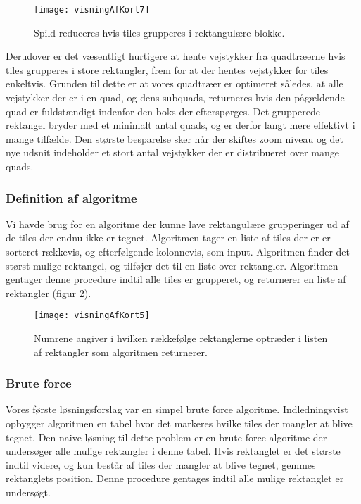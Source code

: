 \begin{figure}[h]
	\centering
	\texttt{[image: visningAfKort7]}
	\captionsetup{width=0.8\textwidth}
	\caption{Spild reduceres hvis tiles grupperes i rektangulære blokke.}
	\label{figur:visningAfKort7}
\end{figure}

Derudover er det væsentligt hurtigere at hente vejstykker fra quadtræerne hvis tiles grupperes i store rektangler, frem for at der hentes vejstykker for tiles enkeltvis. Grunden til dette er at vores quadtræer er optimeret således, at alle vejstykker der er i en quad, og dens subquads, returneres hvis den pågældende quad er fuldstændigt indenfor den boks der efterspørges. Det grupperede rektangel bryder med et minimalt antal quads, og er derfor langt mere effektivt i mange tilfælde. Den største besparelse sker når der skiftes zoom niveau og det nye udsnit indeholder et stort antal vejstykker der er distribueret over mange quads.

\subsubsection{Definition af algoritme}
\label{subsec:definitionAfAlgoritme}

Vi havde brug for en algoritme der kunne lave rektangulære grupperinger ud af de tiles der endnu ikke er tegnet. Algoritmen tager en liste af tiles der er er sorteret rækkevis, og efterfølgende kolonnevis, som input. Algoritmen finder det størst mulige rektangel, og tilføjer det til en liste over rektangler. Algoritmen gentager denne procedure indtil alle tiles er grupperet, og returnerer en liste af rektangler (figur \ref{figur:visningAfKort5}).

\begin{figure}[h]
	\centering
	\texttt{[image: visningAfKort5]}
	\captionsetup{width=0.8\textwidth}
	\caption{Numrene angiver i hvilken rækkefølge rektanglerne optræder i listen af rektangler som algoritmen returnerer.}
	\label{figur:visningAfKort5}
\end{figure}

\subsubsection{Brute force}
\label{subsec:bruteForce}

Vores første løsningsforslag var en simpel brute force algoritme. Indledningsvist opbygger algoritmen en tabel hvor det markeres hvilke tiles der mangler at blive tegnet. Den naive løsning til dette problem er en brute-force algoritme der undersøger alle mulige rektangler i denne tabel. Hvis rektanglet er det største indtil videre, og kun består af tiles der mangler at blive tegnet, gemmes rektanglets position. Denne procedure gentages indtil alle mulige rektanglet er undersøgt.

